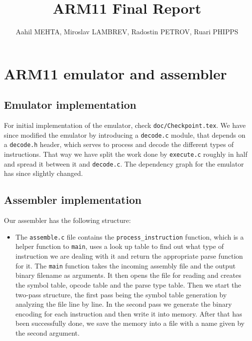 \documentclass[11pt]{article}
\begin{document}
\title{ARM11 Final Report}

\author{Aahil MEHTA, Miroslav LAMBREV, Radostin PETROV, Ruari PHIPPS}

\maketitle

\section{ARM11 emulator and assembler}
\begin{minipage}{0.6\linewidth}
\subsection{Emulator implementation}

For initial implementation of the emulator, check \texttt{doc/Checkpoint.tex}. We have since modified the emulator by introducing a \texttt{decode.c} module, that depends on a \texttt{decode.h} header, which serves to process and decode the different types of instructions. That way we have split the work done by \texttt{execute.c} roughly in half and spread it between it and \texttt{decode.c}. The dependency graph for the emulator has since slightly changed.

\subsection{Assembler implementation}

Our assembler has the following structure:
\begin{itemize}
    \item The \texttt{assemble.c} file contains the \texttt{process\_instruction} function, which is a helper function to \texttt{main}, uses a look up table to find out what type of instruction we are dealing with it and return the appropriate parse function for it. The \texttt{main} function takes the incoming assembly file and the output binary filename as arguments. It then opens the file for reading and creates the symbol table, opcode table and the parse type table. Then we start the two-pass structure, the first pass being the symbol table generation by analyzing the file line by line. In the second pass we generate the binary encoding for each instruction and then write it into memory. After that has been successfully done, we save the memory into a file with a name given by the second argument.
    \end{itemize}
    \end{minipage}
\end{document}
